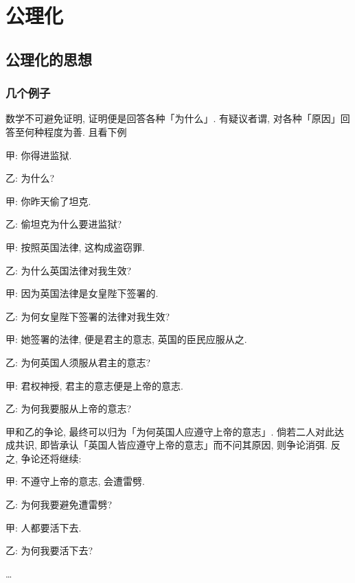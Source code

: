 \documentclass[hidelinks]{ctexart}
\begin{document}

\section{公理化} %
\label{sec:公理化}

\subsection{公理化的思想} %
\label{sub:公理化的思想}

\subsubsection{几个例子} %
\label{ssub:几个例子}

数学不可避免证明, 证明便是回答各种「为什么」. 有疑议者谓, 对各种「原因」回答至何种程度为善. 且看下例
\begin{sample}
    \begin{ex}[甲和乙是两个英国人]\quad
        \label{ex:英国人}
        \begin{citem}
            \item 甲: 你得进监狱.
            \item 乙: 为什么?
            \item 甲: 你昨天偷了坦克.
            \item 乙: 偷坦克为什么要进监狱?
            \item 甲: 按照英国法律, 这构成盗窃罪.
            \item 乙: 为什么英国法律对我生效?
            \item 甲: 因为英国法律是女皇陛下签署的.
            \item 乙: 为何女皇陛下签署的法律对我生效?
            \item 甲: 她签署的法律, 便是君主的意志, 英国的臣民应服从之.
            \item 乙: 为何英国人须服从君主的意志?
            \item 甲: 君权神授, 君主的意志便是上帝的意志.
            \item 乙: 为何我要服从上帝的意志?
        \end{citem}
    \end{ex}
\end{sample}
甲和乙的争论, 最终可以归为「为何英国人应遵守上帝的意志」. 倘若二人对此达成共识, 即皆承认「英国人皆应遵守上帝的意志」而不问其原因, 则争论消弭. 反之, 争论还将继续:
\begin{citem}
    \item 甲: 不遵守上帝的意志, 会遭雷劈.
    \item 乙: 为何我要避免遭雷劈?
    \item 甲: 人都要活下去.
    \item 乙: 为何我要活下去?
    \item \dots
\end{citem}
\end{document}
